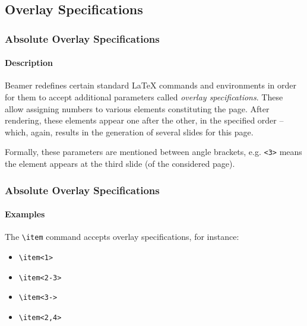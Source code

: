 \documentclass[10pt,    %
    english,            %
    xcolor=table,       %
    envcountsect,       %
    aspectratio=43      %
]{beamer}
\begin{document}
\subsection{Overlay Specifications}
\begin{frame}
    \frametitle{Absolute Overlay Specifications}
    \framesubtitle{Description}
    
    Beamer redefines certain standard \LaTeX{} commands and environments in order for them to accept additional parameters called \textit{overlay specifications}. These allow assigning numbers to various elements constituting the page. After rendering, these elements appear one after the other, in the specified order --which, again, results in the generation of several slides for this page.
    
    \medskip
    Formally, these parameters are mentioned between angle brackets, e.g. \texttt{<3>} means the element appears at the third slide (of the considered page).   
\end{frame}

\begin{frame}
    \frametitle{Absolute Overlay Specifications}
    \framesubtitle{Examples}
    
    The \texttt{\textbackslash{}item} command accepts overlay specifications, for instance:
    \begin{itemize}
       \item<1> \texttt{\textbackslash{}item<1>}
       \item<2-3> \texttt{\textbackslash{}item<2-3>}
       \item<3-> \texttt{\textbackslash{}item<3->}
       \item<2,4> \texttt{\textbackslash{}item<2,4>}
    \end{itemize}
    
    \medskip
    
    \medskip
\end{frame}
\end{document}

